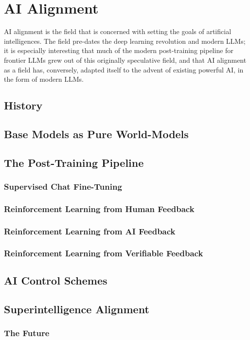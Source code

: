 \chapter{AI Alignment}\label{ch_ai_alignment}

AI alignment is the field that is concerned with setting the goals of
artificial intelligences. The field pre-dates the deep learning revolution and
modern LLMs; it is especially interesting that much of the modern post-training
pipeline for frontier LLMs grew out of this originally speculative field, and
that AI alignment as a field has, conversely, adapted itself to the advent of
existing powerful AI, in the form of modern LLMs.

\section{History}
\cite{bostrom2014superintelligence}

\section{Base Models as Pure World-Models}

\section{The Post-Training Pipeline}
\subsection{Supervised Chat Fine-Tuning}
\subsection{Reinforcement Learning from Human Feedback}
\subsection{Reinforcement Learning from AI Feedback}
\subsection{Reinforcement Learning from Verifiable Feedback}

\section{AI Control Schemes}

\section{Superintelligence Alignment}

\subsection{The Future}
